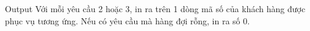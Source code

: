 Output
Với mỗi yêu cầu 2 hoặc 3, in ra trên 1 dòng mã số của khách hàng được phục vụ tương ứng. Nếu có yêu cầu mà hàng đợi rỗng, in ra số 0.